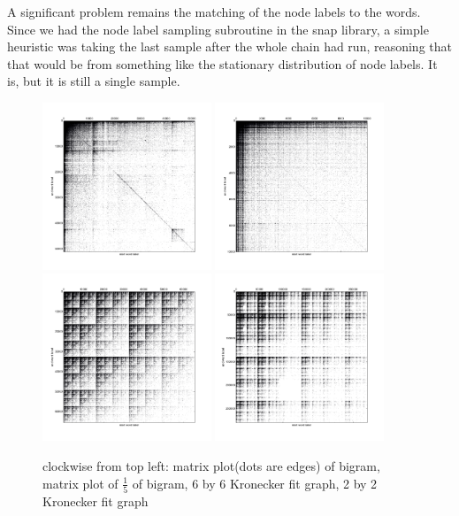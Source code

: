 \documentclass[12pt]{article}
\begin{document}
A significant problem remains the matching of the node labels to the words. Since we had the node label sampling subroutine in the snap library, a simple heuristic was taking the last sample after the whole chain had run, reasoning that that would be from something like the stationary distribution of node labels. It is, but it is still a single sample. %
\begin{figure}
  \includegraphics[width=0.45\textwidth]{bigram_sparsematplot.png}
  \includegraphics[width=0.45\textwidth]{bigram_small_sparsematplot.png}
  \includegraphics[width=0.45\textwidth]{kronfit2_sparsematplot.png}
  \includegraphics[width=0.45\textwidth]{kronfit6_sparsematplot.png}
  \caption{clockwise from top left: matrix plot(dots are edges) of bigram, matrix plot of $\frac{1}{5}$ of bigram, 6 by 6 Kronecker fit graph, 2 by 2 Kronecker fit graph}
\end{figure}
\end{document}
